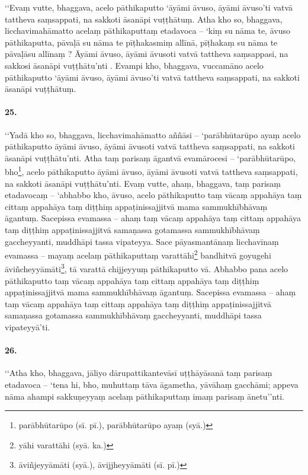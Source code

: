 ‘‘Evaṃ vutte, bhaggava, acelo pāthikaputto ‘āyāmi āvuso, āyāmi āvuso’ti vatvā tattheva saṃsappati, na sakkoti āsanāpi vuṭṭhātuṃ. Atha kho so, bhaggava, licchavimahāmatto acelaṃ pāthikaputtaṃ etadavoca – ‘kiṃ su nāma te, āvuso pāthikaputta, pāvaḷā su nāma te pīṭhakasmiṃ allīnā, pīṭhakaṃ su nāma te pāvaḷāsu allīnaṃ ? Āyāmi āvuso, āyāmi āvusoti vatvā tattheva saṃsappasi, na sakkosi āsanāpi vuṭṭhātu’nti . Evampi kho, bhaggava, vuccamāno acelo pāthikaputto ‘āyāmi āvuso, āyāmi āvuso’ti vatvā tattheva saṃsappati, na sakkoti āsanāpi vuṭṭhātuṃ.

\paragraph{25.} ‘‘Yadā kho so, bhaggava, licchavimahāmatto aññāsi – ‘parābhūtarūpo ayaṃ acelo pāthikaputto āyāmi āvuso, āyāmi āvusoti vatvā tattheva saṃsappati, na sakkoti āsanāpi vuṭṭhātu’nti. Atha taṃ parisaṃ āgantvā evamārocesi – ‘parābhūtarūpo, bho\footnote{parābhūtarūpo (sī. pī.), parābhūtarūpo ayaṃ (syā.)}, acelo pāthikaputto āyāmi āvuso, āyāmi āvusoti vatvā tattheva saṃsappati, na sakkoti āsanāpi vuṭṭhātu’nti. Evaṃ vutte, ahaṃ, bhaggava, taṃ parisaṃ etadavocaṃ – ‘abhabbo kho, āvuso, acelo pāthikaputto taṃ vācaṃ appahāya taṃ cittaṃ appahāya taṃ diṭṭhiṃ appaṭinissajjitvā mama sammukhībhāvaṃ āgantuṃ. Sacepissa evamassa – ahaṃ taṃ vācaṃ appahāya taṃ cittaṃ appahāya taṃ diṭṭhiṃ appaṭinissajjitvā samaṇassa gotamassa sammukhībhāvaṃ gaccheyyanti, muddhāpi tassa vipateyya. Sace pāyasmantānaṃ licchavīnaṃ evamassa – mayaṃ acelaṃ pāthikaputtaṃ varattāhi\footnote{yāhi varattāhi (syā. ka.)} bandhitvā goyugehi āviñcheyyāmāti\footnote{āviñjeyyāmāti (syā.), āvijjheyyāmāti (sī. pī.)}, tā varattā chijjeyyuṃ pāthikaputto vā. Abhabbo pana acelo pāthikaputto taṃ vācaṃ appahāya taṃ cittaṃ appahāya taṃ diṭṭhiṃ appaṭinissajjitvā mama sammukhībhāvaṃ āgantuṃ. Sacepissa evamassa – ahaṃ taṃ vācaṃ appahāya taṃ cittaṃ appahāya taṃ diṭṭhiṃ appaṭinissajjitvā samaṇassa gotamassa sammukhībhāvaṃ gaccheyyanti, muddhāpi tassa vipateyyā’ti.

\paragraph{26.} ‘‘Atha kho, bhaggava, jāliyo dārupattikantevāsī uṭṭhāyāsanā taṃ parisaṃ etadavoca – ‘tena hi, bho, muhuttaṃ tāva āgametha, yāvāhaṃ gacchāmi; appeva nāma ahampi sakkuṇeyyaṃ acelaṃ pāthikaputtaṃ imaṃ parisaṃ ānetu’’nti.

